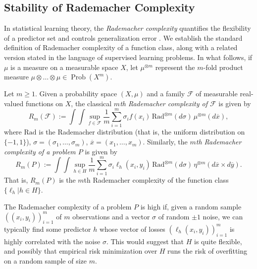 \documentclass[twoside,11pt]{article}
\DeclareMathOperator{\prob}{Prob}
\newcommand{\rad}{\mathrm{Rad}}%
\begin{document}
\subsection{Stability of Rademacher Complexity}\label{subsec:rademacher}
In statistical learning theory, the \emph{Rademacher complexity} quantifies the flexibility of a predictor set and controls generalization error \citep{mohri_foundations_2018}. We establish the standard definition of Rademacher complexity of a function class, along with a related version stated in the language of supervised learning problems. In what follows, if $\mu$ is a measure on a measurable space $X$, let $\mu^{\otimes m}$ represent the $m$-fold product measure $\mu\otimes \dots \otimes \mu \in \prob(X^m)$.
\begin{definition}
    Let $m\geq 1$. Given a probability space $(X,\mu)$ and a family $\mathcal F$ of measurable real-valued functions on $X$, the classical \emph{$m$th Rademacher complexity of $\mathcal F$} is given by
    \[R_m(\mathcal F) := \int\int \sup_{f\in \mathcal F} \frac{1}{m} \sum_{i=1}^m \sigma_i f(x_i)
        \, \rad^{\otimes m}(d\sigma)
        \,\mu^{\otimes m}(d\overline x),\]
    where $\rad$ is the Rademacher distribution (that is, the uniform distribution on $\{-1,1\}$), $\sigma = (\sigma_1,\dots, \sigma_m)$, $\overline x = (x_1,\dots, x_m)$.
    Similarly, the \emph{$m$th Rademacher complexity of a problem $P$} is given by
    \[
    R_m(P) := \int\int \sup_{h\in H} \frac{1}{m} \sum_{i=1}^m \sigma_i \ell_h(x_i,y_i)
    \, \rad^{\otimes m}(d\sigma)
    \,\eta^{\otimes m}(d\overline x \times d\overline y).
    \]
    That is, $R_m(P)$ is the $m$th Rademacher complexity of the function class $\{\ell_h | h\in H\}$.
\end{definition} 
The Rademacher complexity of a problem $P$ is high if, given a random sample $((x_i, y_i))_{i=1}^m$ of $m$ observations and a vector $\sigma$ of random $\pm 1$ noise, we can typically find some predictor $h$ whose vector of losses $(\ell_h(x_i,y_i))_{i=1}^m$ is highly correlated with the noise $\sigma$. This would suggest that $H$ is quite flexible, and possibly that empirical risk minimization over $H$ runs the risk of overfitting on a random sample of size $m$.
\end{document}
